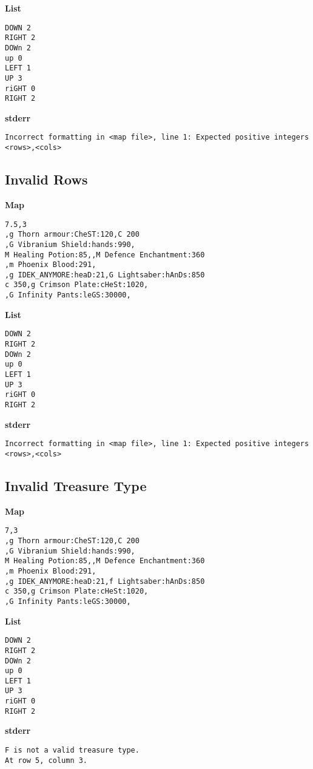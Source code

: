 \documentclass{article}
\begin{document}
\textbf{List}
\begin{lstlisting}
DOWN 2
RIGHT 2
DOWn 2
up 0
LEFT 1
UP 3
riGHT 0
RIGHT 2
\end{lstlisting}
\pagebreak

\textbf{stderr}
\begin{lstlisting}
Incorrect formatting in <map file>, line 1: Expected positive integers <rows>,<cols>
\end{lstlisting}

\subsection{Invalid Rows}

\quad \textbf{Map}
\begin{lstlisting}
7.5,3
,g Thorn armour:CheST:120,C 200
,G Vibranium Shield:hands:990,
M Healing Potion:85,,M Defence Enchantment:360
,m Phoenix Blood:291,
,g IDEK_ANYMORE:heaD:21,G Lightsaber:hAnDs:850
c 350,g Crimson Plate:cHeSt:1020,
,G Infinity Pants:leGS:30000,
\end{lstlisting}

\textbf{List}
\begin{lstlisting}
DOWN 2
RIGHT 2
DOWn 2
up 0
LEFT 1
UP 3
riGHT 0
RIGHT 2
\end{lstlisting}
\pagebreak

\textbf{stderr}
\begin{lstlisting}
Incorrect formatting in <map file>, line 1: Expected positive integers <rows>,<cols>
\end{lstlisting}

\subsection{Invalid Treasure Type}

\quad \textbf{Map}
\begin{lstlisting}
7,3
,g Thorn armour:CheST:120,C 200
,G Vibranium Shield:hands:990,
M Healing Potion:85,,M Defence Enchantment:360
,m Phoenix Blood:291,
,g IDEK_ANYMORE:heaD:21,f Lightsaber:hAnDs:850
c 350,g Crimson Plate:cHeSt:1020,
,G Infinity Pants:leGS:30000,
\end{lstlisting}

\textbf{List}
\begin{lstlisting}
DOWN 2
RIGHT 2
DOWn 2
up 0
LEFT 1
UP 3
riGHT 0
RIGHT 2
\end{lstlisting}
\pagebreak

\textbf{stderr}
\begin{lstlisting}
F is not a valid treasure type.
At row 5, column 3.
\end{lstlisting}
\end{document}
